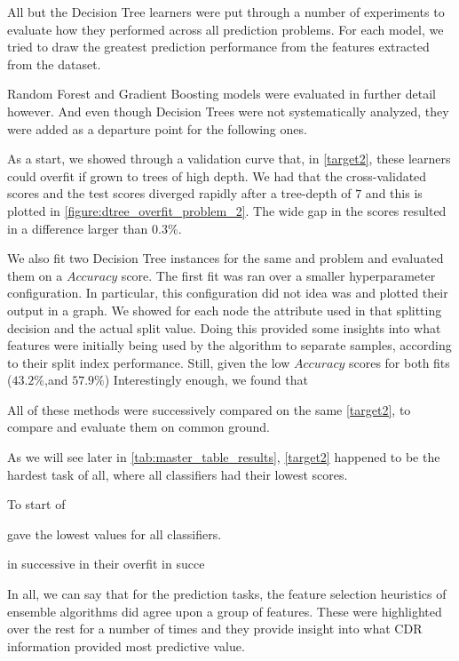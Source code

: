 All but the Decision Tree learners were put through a number of experiments to evaluate how they performed across all prediction problems.
For each model, we tried to draw the greatest prediction performance from the features extracted from the dataset.

Random Forest and Gradient Boosting models were evaluated in further detail however.
And even though Decision Trees were not systematically analyzed, they were added as a departure point for the following ones.

As a start, we showed through a validation curve that, in \cref{target2}, these learners could overfit if grown to trees of high depth.
We had that the cross-validated scores and the test scores diverged rapidly after a tree-depth of $7$ and this is plotted in \cref{figure:dtree_overfit_problem_2}.
The wide gap in the scores resulted in a difference larger than $0.3\%$.

We also fit two Decision Tree instances for the same and problem and evaluated them on a $Accuracy$ score.
The first fit was ran over a smaller hyperparameter configuration.
In particular, this configuration did not
idea was
 and plotted their output in a graph.
We showed for each node the attribute used in that splitting decision and the actual split value.
Doing this provided some insights into what features were initially being used by the algorithm to separate samples, according to their split index performance.
Still, given the low $Accuracy$ scores for both fits ($43.2\%$,and $57.9\%$)
Interestingly enough, we found that

All of these methods were successively compared on the same \cref{target2}, to compare and evaluate them on common ground.

As we will see later in \cref{tab:master_table_results}, \cref{target2} happened to be the hardest task of all, where all classifiers had their lowest scores.

To start of

 gave the lowest values for all classifiers.

in successive
in their overfit
 in succe








In all, we can say that for the prediction tasks, the feature selection heuristics of ensemble algorithms did agree upon a group of features.
These were highlighted over the rest for a number of times and they provide insight into what CDR information provided most
predictive value.

